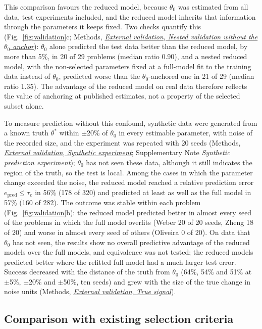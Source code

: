\documentclass[pdflatex,sn-nature]{sn-jnl}
\theoremstyle{plain}
\newcommand{\mref}[2]{\hyperref[#1]{#2}}
\begin{document}
This comparison favours the reduced model, because $\theta_0$ was estimated from all data, test experiments included, and the reduced model inherits that information through the parameters it keeps fixed. Two checks quantify this (Fig.~\ref{fig:validation}c; Methods, \mref{met:val-nested}{\emph{External validation}, \emph{Nested validation without the $\theta_0$ anchor}}): $\theta_0$ alone predicted the test data better than the reduced model, by more than 5\%, in 20 of 29 problems (median ratio 0.90), and a nested reduced model, with the non-selected parameters fixed at a full-model fit to the training data instead of $\theta_0$, predicted worse than the $\theta_0$-anchored one in 21 of 29 (median ratio 1.35). The advantage of the reduced model on real data therefore reflects the value of anchoring at published estimates, not a property of the selected subset alone.

To measure prediction without this confound, synthetic data were generated from a known truth $\theta^\ast$ within $\pm$20\% of $\theta_0$ in every estimable parameter, with noise of the recorded size, and the experiment was repeated with 20 seeds (Methods, \mref{met:val-synth}{\emph{External validation}, \emph{Synthetic experiment}}; Supplementary Note \textit{Synthetic prediction experiment}); $\theta_0$ has not seen these data, although it still indicates the region of the truth, so the test is local. Among the cases in which the parameter change exceeded the noise, the reduced model reached a relative prediction error $e_{\mathrm{pred}}\le\tau_e$ in 56\% (178 of 320) and predicted at least as well as the full model in 57\% (160 of 282). The outcome was stable within each problem (Fig.~\ref{fig:validation}b): the reduced model predicted better in almost every seed of the problems in which the full model overfits (Weber 20 of 20 seeds, Zheng 18 of 20) and worse in almost every seed of others (Oliveira 0 of 20). On data that $\theta_0$ has not seen, the results show no overall predictive advantage of the reduced models over the full models, and equivalence was not tested; the reduced models predicted better where the refitted full model had a much larger test error. Success decreased with the distance of the truth from $\theta_0$ (64\%, 54\% and 51\% at $\pm$5\%, $\pm$20\% and $\pm$50\%, ten seeds) and grew with the size of the true change in noise units (Methods, \mref{met:val-signal}{\emph{External validation}, \emph{True signal}}).


\subsection*{Comparison with existing selection criteria}\label{sec:comparison}
\end{document}
